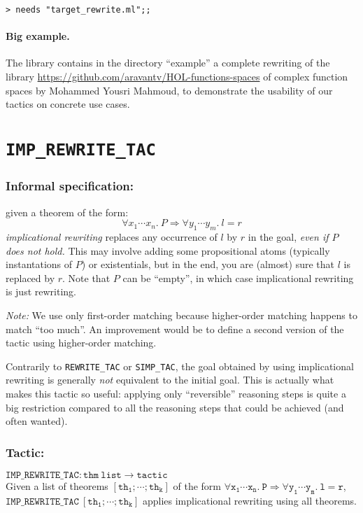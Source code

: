 \documentclass{llncs}
\newcommand*\IMPREWRITETAC{\texttt{IMP\_REWRITE\_TAC}\xspace}
\newcommand*\REWRITETAC{\texttt{REWRITE\_TAC}\xspace}
\newcommand*\SIMPTAC{\texttt{SIMP\_TAC}\xspace}
\begin{document}
		\bigskip
    \texttt{> needs "target\_rewrite.ml";;}

  \paragraph{Big example.}
    The library contains in the directory ``example'' a complete rewriting of the library 
    \url{https://github.com/aravantv/HOL-functions-spaces} of complex function spaces by Mohammed Yousri Mahmoud,
    to demonstrate the usability of our tactics on concrete use cases.

	\section{\IMPREWRITETAC}
		\subsubsection{Informal specification:}
		given a theorem of the form:
    \[\forall x_1\cdots x_n.\ P \Rightarrow \forall y_1\cdots y_m.\ l = r\]
    \emph{implicational rewriting} replaces any occurrence of $l$ by $r$
    in the goal, \emph{even if $P$ does not hold.}
		This may involve adding some propositional atoms (typically instantations of $P$) or existentials,
    but in the end, you are (almost) sure that $l$ is replaced by $r$.
    Note that $P$ can be ``empty'', in which case implicational rewriting is just rewriting.

    \emph{Note:} We use only first-order matching because higher-order matching happens to match ``too much''.
    An improvement would be to define a second version of the tactic using higher-order matching.

    \begin{remark}
      Contrarily to \REWRITETAC or \SIMPTAC, the goal obtained by using implicational rewriting is generally 
      \emph{not} equivalent to the initial goal. This is actually what makes this tactic so useful:
      applying only ``reversible'' reasoning steps is quite a big restriction compared to all the
      reasoning steps that could be achieved (and often wanted).
    \end{remark}

		\subsubsection{Tactic:}
		$\mathtt{\IMPREWRITETAC: thm\ list \to tactic}$\\
    Given a list of theorems $\mathtt{[th_1;\cdots;th_k]}$
    of the form $\mathtt{\forall x_1\cdots x_n.\ P \Rightarrow \forall y_1\cdots y_m.\ l = r}$,
		$\mathtt{\IMPREWRITETAC\ [th_1;\cdots;th_k]}$ applies implicational rewriting using all theorems.
\end{document}

